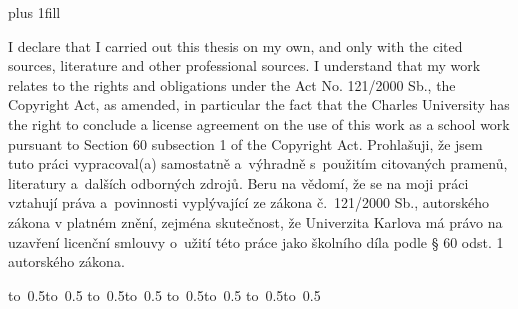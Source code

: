 \newpage

\openright
\hypersetup{pageanchor=true}
\pagestyle{plain}
\vglue 0pt plus 1fill

\ifEN
\noindent
I declare that I carried out this \ThesisAccusative thesis on my own, and only with the cited sources, literature and other professional sources. I understand that my work relates to the rights and obligations under the Act No. 121/2000 Sb., the Copyright Act, as amended, in particular the fact that the Charles University has the right to conclude a license agreement on the use of this work as a school work pursuant to Section 60 subsection 1 of the Copyright Act.
\else
\noindent
Prohlašuji, že jsem tuto \ThesisAccusative práci vypracoval(a) samostatně a~výhradně s~použitím citovaných pramenů, literatury a~dalších odborných zdrojů. Beru na vědomí, že se na moji práci vztahují práva a~povinnosti vyplývající ze zákona č.~121/2000 Sb., autorského zákona v platném znění, zejména skutečnost, že Univerzita Karlova má právo na uzavření licenční smlouvy o~užití této práce jako školního díla podle § 60 odst. 1 autorského zákona.
\fi

\vspace{10mm}


\ifEN
\hbox{\hbox to 0.5\hbox to 0.5\hsize{\dotfill\quad}}
\smallskip
\hbox{\hbox to 0.5\hsize{}\hbox to 0.5}
\else
\hbox{\hbox to 0.5\hbox to 0.5\hsize{\dotfill\quad}}
\smallskip
\hbox{\hbox to 0.5\hsize{}\hbox to 0.5}
\fi

\vspace{20mm}
\newpage


\openright

\noindent
\Dedication

\newpage


\openright

